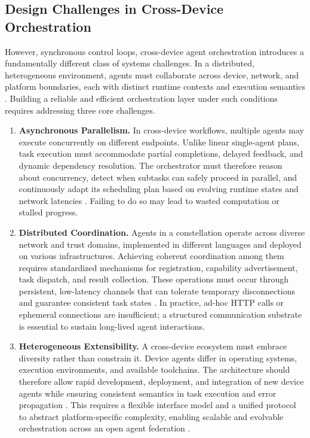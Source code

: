 \documentclass[10pt]{article} %
\begin{document}
\subsection{Design Challenges in Cross-Device Orchestration}
\label{sec:background:challenges}
However, synchronous control loops, cross-device agent orchestration introduces a fundamentally different class of systems challenges. In a distributed, heterogeneous environment, agents must collaborate across device, network, and platform boundaries, each with distinct runtime contexts and execution semantics \cite{tran2025multi}. Building a reliable and efficient orchestration layer under such conditions requires addressing three core challenges.
\begin{enumerate}
    \item \textbf{Asynchronous Parallelism.}  
    In cross-device workflows, multiple agents may execute concurrently on different endpoints. Unlike linear single-agent plans, task execution must accommodate partial completions, delayed feedback, and dynamic dependency resolution. The orchestrator must therefore reason about concurrency, detect when subtasks can safely proceed in parallel, and continuously adapt its scheduling plan based on evolving runtime states and network latencies \cite{yu2025dyntaskmas}. Failing to do so may lead to wasted computation or stalled progress.
    
    \item \textbf{Distributed Coordination.}  
    Agents in a constellation operate across diverse network and trust domains, implemented in different languages and deployed on various infrastructures. Achieving coherent coordination among them requires standardized mechanisms for registration, capability advertisement, task dispatch, and result collection. These operations must occur through persistent, low-latency channels that can tolerate temporary disconnections and guarantee consistent task states \cite{cheninternet}. In practice, ad-hoc HTTP calls or ephemeral connections are insufficient; a structured communication substrate is essential to sustain long-lived agent interactions.

    \item \textbf{Heterogeneous Extensibility.}  
    A cross-device ecosystem must embrace diversity rather than constrain it. Device agents differ in operating systems, execution environments, and available toolchains. The architecture should therefore allow rapid development, deployment, and integration of new device agents while ensuring consistent semantics in task execution and error propagation \cite{wu2024autogen}. This requires a flexible interface model and a unified protocol to abstract platform-specific complexity, enabling scalable and evolvable orchestration across an open agent federation \cite{yang2025survey}.
\end{enumerate}
\end{document}
